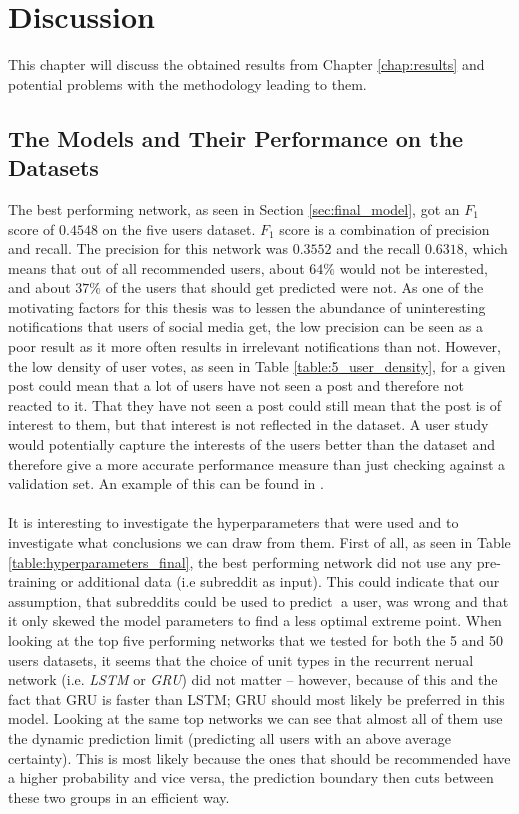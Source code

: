 \chapter{Discussion}\label{chap:discussion}

This chapter will discuss the obtained results from Chapter \ref{chap:results} and potential problems with the methodology leading to them.

\section{The Models and Their Performance on the Datasets}
The best performing network, as seen in Section \ref{sec:final_model}, got an $F_1$ score of $0.4548$ on the five users dataset. $F_1$ score is a combination of precision and recall. The precision for this network was $0.3552$ and the recall $0.6318$, which means that out of all recommended users, about $64\%$ would not be interested, and about $37\%$ of the users that should get predicted were not. As one of the motivating factors for this thesis was to lessen the abundance of uninteresting notifications that users of social media get, the low precision can be seen as a poor result as it more often results in irrelevant notifications than not. However, the low density of user votes, as seen in Table \ref{table:5_user_density}, for a given post could mean that a lot of users have not seen a post and therefore not reacted to it. That they have not seen a post could still mean that the post is of interest to them, but that interest is not reflected in the dataset. A user study would potentially capture the interests of the users better than the dataset and therefore give a more accurate performance measure than just checking against a validation set. An example of this can be found in \cite{suorra2016assisting}.
\\\\
It is interesting to investigate the hyperparameters that were used and to investigate what conclusions we can draw from them. First of all, as seen in Table \ref{table:hyperparameters_final}, the best performing network did not use any pre-training or additional data (i.e subreddit as input). This could indicate that our assumption, that subreddits could be used to predict a user, was wrong and that it only skewed the model parameters to find a less optimal extreme point. When looking at the top five performing networks that we tested for both the 5 and 50 users datasets, it seems that the choice of unit types in the recurrent nerual network (i.e. \textit{LSTM} or \textit{GRU}) did not matter -- however, because of this and the fact that GRU is faster than LSTM; GRU should most likely be preferred in this model. Looking at the same top networks we can see that almost all of them use the dynamic prediction limit (predicting all users with an above average certainty). This is most likely because the ones that should be recommended have a higher probability and vice versa, the prediction boundary then cuts between these two groups in an efficient way.
